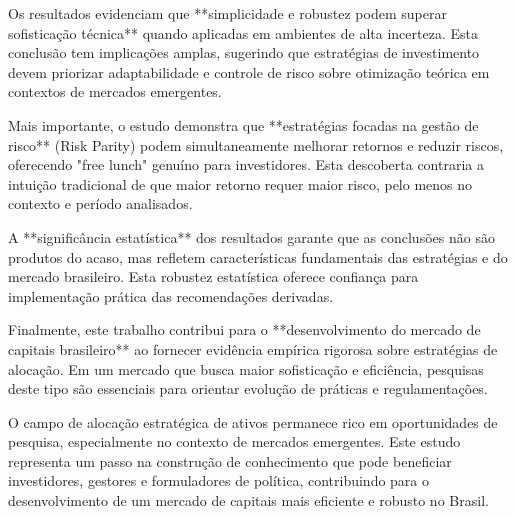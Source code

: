 Os resultados evidenciam que **simplicidade e robustez podem superar sofisticação técnica** quando aplicadas em ambientes de alta incerteza. Esta conclusão tem implicações amplas, sugerindo que estratégias de investimento devem priorizar adaptabilidade e controle de risco sobre otimização teórica em contextos de mercados emergentes.

Mais importante, o estudo demonstra que **estratégias focadas na gestão de risco** (Risk Parity) podem simultaneamente melhorar retornos e reduzir riscos, oferecendo "free lunch" genuíno para investidores. Esta descoberta contraria a intuição tradicional de que maior retorno requer maior risco, pelo menos no contexto e período analisados.

A **significância estatística** dos resultados garante que as conclusões não são produtos do acaso, mas refletem características fundamentais das estratégias e do mercado brasileiro. Esta robustez estatística oferece confiança para implementação prática das recomendações derivadas.

Finalmente, este trabalho contribui para o **desenvolvimento do mercado de capitais brasileiro** ao fornecer evidência empírica rigorosa sobre estratégias de alocação. Em um mercado que busca maior sofisticação e eficiência, pesquisas deste tipo são essenciais para orientar evolução de práticas e regulamentações.

O campo de alocação estratégica de ativos permanece rico em oportunidades de pesquisa, especialmente no contexto de mercados emergentes. Este estudo representa um passo na construção de conhecimento que pode beneficiar investidores, gestores e formuladores de política, contribuindo para o desenvolvimento de um mercado de capitais mais eficiente e robusto no Brasil.
